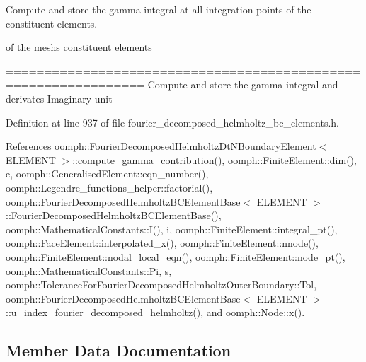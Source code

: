 Compute and store the gamma integral at all integration points of the constituent elements. 

of the mesh\textquotesingle{}s constituent elements

================================================================ Compute and store the gamma integral and derivates Imaginary unit 

Definition at line 937 of file fourier\+\_\+decomposed\+\_\+helmholtz\+\_\+bc\+\_\+elements.\+h.



References oomph\+::\+Fourier\+Decomposed\+Helmholtz\+Dt\+N\+Boundary\+Element$<$ E\+L\+E\+M\+E\+N\+T $>$\+::compute\+\_\+gamma\+\_\+contribution(), oomph\+::\+Finite\+Element\+::dim(), e, oomph\+::\+Generalised\+Element\+::eqn\+\_\+number(), oomph\+::\+Legendre\+\_\+functions\+\_\+helper\+::factorial(), oomph\+::\+Fourier\+Decomposed\+Helmholtz\+B\+C\+Element\+Base$<$ E\+L\+E\+M\+E\+N\+T $>$\+::\+Fourier\+Decomposed\+Helmholtz\+B\+C\+Element\+Base(), oomph\+::\+Mathematical\+Constants\+::\+I(), i, oomph\+::\+Finite\+Element\+::integral\+\_\+pt(), oomph\+::\+Face\+Element\+::interpolated\+\_\+x(), oomph\+::\+Finite\+Element\+::nnode(), oomph\+::\+Finite\+Element\+::nodal\+\_\+local\+\_\+eqn(), oomph\+::\+Finite\+Element\+::node\+\_\+pt(), oomph\+::\+Mathematical\+Constants\+::\+Pi, s, oomph\+::\+Tolerance\+For\+Fourier\+Decomposed\+Helmholtz\+Outer\+Boundary\+::\+Tol, oomph\+::\+Fourier\+Decomposed\+Helmholtz\+B\+C\+Element\+Base$<$ E\+L\+E\+M\+E\+N\+T $>$\+::u\+\_\+index\+\_\+fourier\+\_\+decomposed\+\_\+helmholtz(), and oomph\+::\+Node\+::x().



\subsection{Member Data Documentation}
\mbox{\label{classoomph_1_1FourierDecomposedHelmholtzDtNMesh_a8a58410244815336ffacc1e33cbc0565}} 

